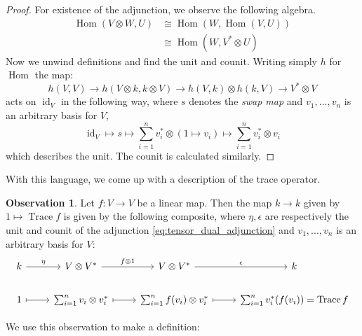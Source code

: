 \documentclass[12pt]{article}
\theoremstyle{plain}
\theoremstyle{definition}
\newtheorem{observation}[thm]{Observation}
\newcommand{\lto}{\longrightarrow}
\begin{document}
\begin{proof}
	For existence of the adjunction, we observe the following algebra.
	\begin{align}
		\operatorname{Hom}(V \otimes W, U) &\cong \operatorname{Hom}(W, \operatorname{Hom}(V,U))\\
		&\cong \operatorname{Hom}(W, V^\ast \otimes U )
	\end{align}
	Now we unwind definitions and find the unit and counit. Writing simply $h$ for $\operatorname{Hom}$ the map:
	\begin{equation}
		h(V,V) \lto h(V \otimes k, k \otimes V) \lto h(V,k) \otimes h(k,V) \lto V^\ast \otimes V
	\end{equation}
	acts on $\operatorname{id}_V$ in the following way, where $s$ denotes the \emph{swap map} and $v_1,...,v_n$ is an arbitrary basis for $V$,
	\begin{equation}
		\operatorname{id}_V \longmapsto s \longmapsto \sum_{i = 1}^n v_i^\ast \otimes (1 \mapsto v_i) \longmapsto \sum_{i = 1}^nv_i^\ast \otimes v_i
	\end{equation}
	which describes the unit. The counit is calculated similarly.
\end{proof}
With this language, we come up with a description of the trace operator.
\begin{observation}
	Let $f: V \lto V$ be a linear map. Then the map $k \lto k$ given by $1 \longmapsto \operatorname{Trace}f$ is given by the following composite, where $\eta,\epsilon$ are respectively the unit and counit of the adjunction \eqref{eq:tensor_dual_adjunction} and $v_1,...,v_n$ is an arbitrary basis for $V$:
	\begin{equation}
		\begin{tikzcd}
			k\arrow[r,"{\eta}"] & V \otimes V^\ast\arrow[r, "{f \otimes 1}"] & V \otimes V^\ast\arrow[r,"{\epsilon}"] & k\\
			1\arrow[r,mapsto] & \sum_{i = 1}^n v_i \otimes v_i^\ast\arrow[r,mapsto] & \sum_{i = 1}^n f(v_i) \otimes v_i^\ast\arrow[r,mapsto] & \sum_{i = 1}^n v_i^{\ast}(f(v_i)) = \operatorname{Trace}f
		\end{tikzcd}
	\end{equation}
\end{observation}
We use this observation to make a definition:
\end{document}
